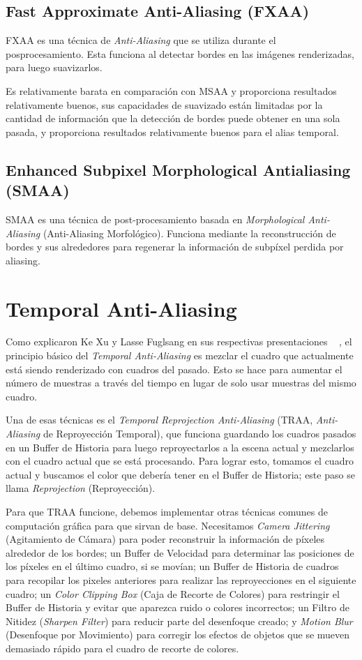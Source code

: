\documentclass{cslthse-msc}
\begin{document}
\subsection{Fast Approximate Anti-Aliasing (FXAA)}
FXAA es una técnica de \textit{Anti-Aliasing} que se utiliza durante el posprocesamiento. Esta funciona al detectar bordes en las imágenes renderizadas, para luego suavizarlos. \cite{Lottes2009}

Es relativamente barata en comparación con MSAA y proporciona resultados relativamente buenos, sus capacidades de suavizado están limitadas por la cantidad de información que la detección de bordes puede obtener en una sola pasada, y proporciona resultados relativamente buenos para el alias temporal.

\subsection{Enhanced Subpixel Morphological Antialiasing (SMAA)}
SMAA es una técnica de post-procesamiento basada en \textit{Morphological Anti-Aliasing} (Anti-Aliasing Morfológico). Funciona mediante la reconstrucción de bordes y sus alrededores para regenerar la información de subpíxel perdida por aliasing. \cite{Jimenez2012}

\section{Temporal Anti-Aliasing}
Como explicaron Ke Xu y Lasse Fuglsang en sus respectivas presentaciones ~ \cite{XU2016, Fuglsand2016}, el principio básico del \textit{Temporal Anti-Aliasing} es mezclar el cuadro que actualmente está siendo renderizado con cuadros del pasado. Esto se hace para aumentar el número de muestras a través del tiempo en lugar de solo usar muestras del mismo cuadro.

Una de esas técnicas es el \textit{Temporal Reprojection Anti-Aliasing}  (TRAA, \textit{Anti-Aliasing} de Reproyección Temporal), que funciona guardando los cuadros pasados en un Buffer de Historia para luego reproyectarlos a la escena actual y mezclarlos con el cuadro actual que se está procesando. Para lograr esto, tomamos el cuadro actual y buscamos el color que debería tener en el Buffer de Historia; este paso se llama \textit{Reprojection} (Reproyección).

Para que TRAA funcione, debemos implementar otras técnicas comunes de computación gráfica para que sirvan de base. Necesitamos \textit{Camera Jittering} (Agitamiento de Cámara) para poder reconstruir la información de píxeles alrededor de los bordes; un Buffer de Velocidad para determinar las posiciones de los píxeles en el último cuadro, si se movían; un Buffer de Historia de cuadros para recopilar los pixeles anteriores para realizar las reproyecciones en el siguiente cuadro; un \textit{Color Clipping Box} (Caja de Recorte de Colores) para restringir el Buffer de Historia y evitar que aparezca ruido o colores incorrectos; un Filtro de Nitidez (\textit{Sharpen Filter}) para reducir parte del desenfoque creado; y \textit{Motion Blur} (Desenfoque por Movimiento) para corregir los efectos de objetos que se mueven demasiado rápido para el cuadro de recorte de colores.
\end{document}
